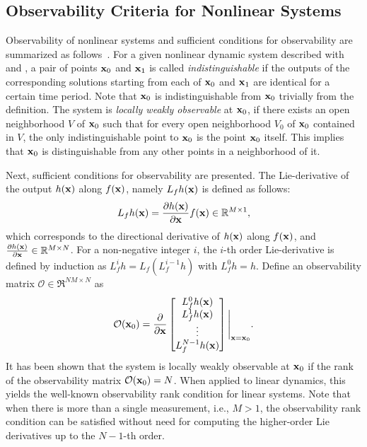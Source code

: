 \subsection{Observability Criteria for Nonlinear Systems}



Observability of nonlinear systems and sufficient conditions for observability are summarized as follows~\cite{HerKreITAC77}. For a given nonlinear dynamic system described with  and , a pair of points $\mathbf{x}_0$ and $\mathbf{x}_1$ is called \textit{indistinguishable} if the outputs of the corresponding solutions starting from each of $\mathbf{x}_0$ and $\mathbf{x}_1$ are identical for a certain time period. Note that $\mathbf{x}_0$ is indistinguishable from $\mathbf{x}_0$ trivially from the definition. The system is \textit{locally weakly observable} at $\mathbf{x}_0$, if there exists an open neighborhood $V$ of $\mathbf{x}_0$ such that for every open neighborhood $V_0$ of $\mathbf{x}_0$ contained in $V$, the only indistinguishable point to $\mathbf{x}_0$ is the point $\mathbf{x}_0$ itself. This implies that $\mathbf{x}_0$ is distinguishable from any other points in a neighborhood of it.  

Next, sufficient conditions for observability are presented. The Lie-derivative of the output $h(\mathbf{x})$ along $f(\mathbf{x})$, namely $L_f h(\mathbf{x})$ is defined as follows:
\begin{align*}
L_f h(\mathbf{x}) = \frac{\partial h(\mathbf{x})}{\partial \mathbf{x}}f(\mathbf{x})\in\mathbb{R}^{M\times 1},
\end{align*}
which corresponds to the directional derivative of $h(\mathbf{x})$ along $f(\mathbf{x})$, and $\frac{\partial h(\mathbf{x})}{\partial \mathbf{x}}\in\mathbb{R}^{M\times N}$. For a non-negative integer $i$, the $i$-th order Lie-derivative is defined by induction as $L_f^i h = L_f (L_f^{i-1} h)$ with $L_f^0 h = h$. Define an observability matrix $\mathcal{O}\in\Re^{NM\times N}$ as
\begin{align*}
\mathcal{O}(\mathbf{x}_0) = \frac{\partial }{\partial \mathbf{x}} \begin{bmatrix} L_f^0 h(\mathbf{x}) \\ L_f^1 h(\mathbf{x})\\ \vdots \\L_f^{N-1} h(\mathbf{x})\end{bmatrix}\Bigg|_{\mathbf{x}=\mathbf{x}_0}.
\end{align*}
It has been shown that the system is locally weakly observable at $\mathbf{x}_0$ if the rank of the observability matrix $\mathcal{O}(\mathbf{x}_0) = N$. When applied to linear dynamics, this yields the well-known observability rank condition for linear systems. Note that when there is more than a single measurement, i.e., $M>1$, the observability rank condition can be satisfied without need for computing the higher-order Lie derivatives up to the $N-1$-th order.

